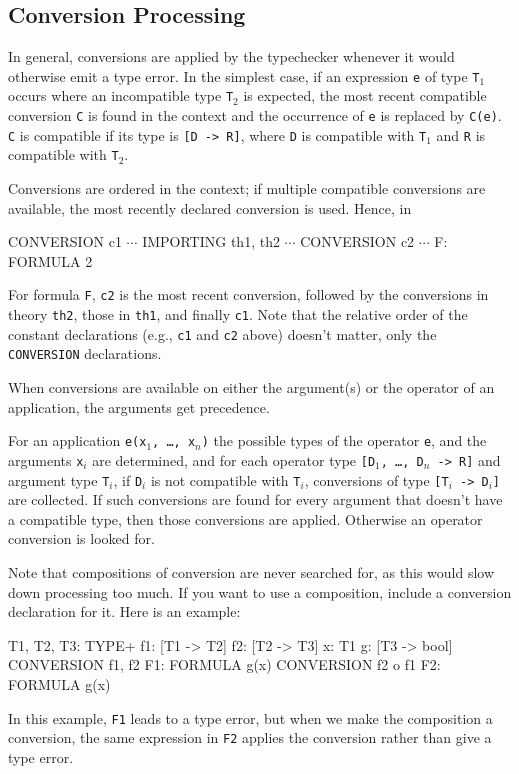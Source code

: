 \subsection{Conversion Processing}

In general, conversions are applied by the typechecker whenever it would
otherwise emit a type error.  In the simplest case, if an expression
\texttt{e} of type \texttt{T$_1$} occurs where an incompatible type
\texttt{T$_2$} is expected, the most recent compatible conversion
\texttt{C} is found in the context and the occurrence of \texttt{e} is
replaced by \texttt{C(e)}.  \texttt{C} is compatible if its type is
\texttt{[D -> R]}, where \texttt{D} is compatible with \texttt{T$_1$} and
\texttt{R} is compatible with \texttt{T$_2$}.

Conversions are ordered in the context; if multiple compatible conversions
are available,  the most recently declared conversion is used.  Hence, in

\begin{pvsex}
  CONVERSION c1
  \(\cdots\)
  IMPORTING th1, th2
  \(\cdots\)
  CONVERSION c2
  \(\cdots\)
  F: FORMULA 2
\end{pvsex}

For formula \texttt{F}, \texttt{c2} is the most recent conversion,
followed by the conversions in theory \texttt{th2}, those in \texttt{th1},
and finally \texttt{c1}.  Note that the relative order of the constant
declarations (e.g., \texttt{c1} and \texttt{c2} above) doesn't matter,
only the \texttt{CONVERSION} declarations.

When conversions are available on either the argument(s) or the operator
of an application, the arguments get precedence.

For an application \texttt{e(x$_1$, \ldots, x$_n$)} the possible types of
the operator \texttt{e}, and the arguments \texttt{x$_i$} are determined,
and for each operator type \texttt{[D$_1$, \ldots, D$_n$ -> R]} and
argument type \texttt{T$_i$}, if \texttt{D$_i$} is not compatible with
\texttt{T$_i$}, conversions of type \texttt{[T$_i$ -> D$_i$]} are
collected.  If such conversions are found for every argument that doesn't
have a compatible type, then those conversions are applied.  Otherwise an
operator conversion is looked for.

Note that compositions of conversion are never searched for, as this would
slow down processing too much.  If you want to use a composition, include
a conversion declaration for it.  Here is an example:
\begin{session}
  T1, T2, T3: TYPE+
  f1: [T1 -> T2]
  f2: [T2 -> T3]
  x: T1
  g: [T3 -> bool]
  CONVERSION f1, f2
  F1: FORMULA g(x)
  CONVERSION f2 o f1
  F2: FORMULA g(x)
\end{session}
In this example, \texttt{F1} leads to a type error, but when we make the
composition a conversion, the same expression in \texttt{F2} applies the
conversion rather than give a type error.

